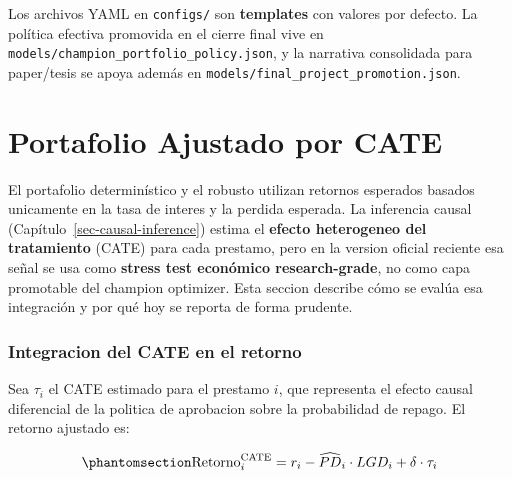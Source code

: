 \documentclass[
  spanish,
  11pt,
  letterpaper,
]{scrbook}
\theoremstyle{plain}
\theoremstyle{remark}
\begin{document}
\begin{tcolorbox}[enhanced jigsaw, arc=.35mm, bottomrule=.15mm, bottomtitle=1mm, breakable, colback=white, colbacktitle=quarto-callout-warning-color!10!white, colframe=quarto-callout-warning-color-frame, coltitle=black, left=2mm, leftrule=.75mm, opacityback=0, opacitybacktitle=0.6, rightrule=.15mm, title=\textcolor{quarto-callout-warning-color}{\faExclamationTriangle}\hspace{0.5em}{Configuracion como template}, titlerule=0mm, toprule=.15mm, toptitle=1mm]

Los archivos YAML en \texttt{configs/} son \textbf{templates} con
valores por defecto. La política efectiva promovida en el cierre final
vive en \texttt{models/champion\_portfolio\_policy.json}, y la narrativa
consolidada para paper/tesis se apoya además en
\texttt{models/final\_project\_promotion.json}.

\end{tcolorbox}

\chapter{Portafolio Ajustado por CATE}\label{sec-cate-portfolio}

El portafolio determinístico y el robusto utilizan retornos esperados
basados unicamente en la tasa de interes y la perdida esperada. La
inferencia causal (Capítulo~\ref{sec-causal-inference}) estima el
\textbf{efecto heterogeneo del tratamiento} (CATE) para cada prestamo,
pero en la version oficial reciente esa señal se usa como \textbf{stress
test económico research-grade}, no como capa promotable del champion
optimizer. Esta seccion describe cómo se evalúa esa integración y por
qué hoy se reporta de forma prudente.

\subsection{Integracion del CATE en el
retorno}\label{integracion-del-cate-en-el-retorno}

Sea \(\tau_i\) el CATE estimado para el prestamo \(i\), que representa
el efecto causal diferencial de la politica de aprobacion sobre la
probabilidad de repago. El retorno ajustado es:

\begin{equation}\protect\phantomsection\label{eq-cate-return}{
\text{Retorno}_i^{\text{CATE}} = r_i - \widehat{PD}_i \cdot LGD_i + \delta \cdot \tau_i
}\end{equation}
\end{document}
